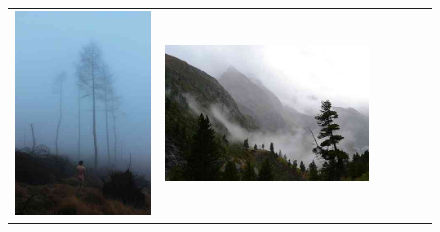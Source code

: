 \begin{figure}
\begin{minipage}[t]{\textwidth}
\begin{tabular}{m{.01\linewidth} m{.16\linewidth} m{.16\linewidth} m{.16\linewidth} m{.16\linewidth} m{.16\linewidth}}
    \includegraphics[width=\linewidth]{../style/figures/flickr_on_flickr/pred_style_Hazy/2.jpg} &
    \includegraphics[width=\linewidth]{../style/figures/flickr_on_flickr/pred_style_Hazy/3.jpg} &

\end{tabular}
\end{minipage}
\end{figure}
